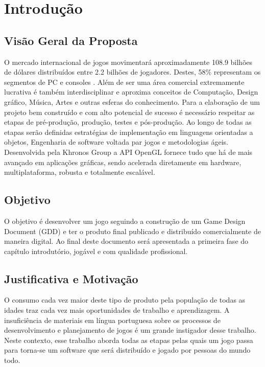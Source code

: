 \documentclass[12pt, 
openright, 
oneside, 
a4paper,    
brazil]{facom-ufu-abntex2}
\begin{document}

\chapter{Introdução}

\section{Visão Geral da Proposta}
O mercado internacional de jogos movimentará aproximadamente 108.9
bilhões de dólares distribuídos entre 2.2 bilhões de jogadores. Destes, 58\%
representam os segmentos de PC e consoles \cite{GameMarketArticle}. Além de ser uma área
comercial extremamente lucrativa é também interdisciplinar e aproxima
conceitos de Computação, Design gráfico, Música, Artes e outras esferas do
conhecimento.
Para a elaboração de um projeto bem construído e com alto potencial de
sucesso é necessário respeitar as etapas de pré-produção, produção, testes
e pós-produção. Ao longo de todas as etapas serão definidas estratégias de
implementação em linguagens orientadas a objetos, Engenharia de software
voltada par jogos e metodologias ágeis.
Desenvolvida pela Khronos Group a API OpenGL fornece tudo que há de mais
avançado em aplicações gráficas, sendo acelerada diretamente em
hardware, multiplataforma, robusta e totalmente escalável.


\section{Objetivo}
O objetivo é desenvolver um jogo seguindo a construção de um Game Design
Document (GDD) e ter o produto final publicado e distribuído
comercialmente de maneira digital. Ao final deste documento será
apresentada a primeira fase do capítulo introdutório, jogável e com
qualidade profissional.

\section{Justificativa e Motivação}
O consumo cada vez maior deste tipo de produto pela população de todas as idades traz cada vez mais oportunidades de trabalho e aprendizagem.
A insuficiência de materiais em língua portuguesa sobre os processos de desenvolvimento e planejamento de jogos é um grande instigador desse trabalho. Neste contexto, esse trabalho aborda todas as etapas pelas quais um jogo passa para torna-se um software que será distribuído e jogado por pessoas do mundo todo.
\end{document}
